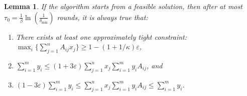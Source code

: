 \documentclass[11pt]{article}
\newtheorem{lemma}[theorem]{Lemma}
\newif\iffullpaper
\begin{document}
\begin{lemma}\label{lemma:approx-comp-slack}
If the algorithm starts from a feasible solution, then after at most $\tau_0 = \frac{1}{\beta}\ln\left(\frac{1}{\delta_{\min}}\right)$ rounds, it is always true that:
\begin{enumerate}[noitemsep,topsep=3pt]
\item There exists at least one approximately tight constraint: $\max_i\big\{\sum_{j=1}^n A_{ij}x_j\big\}\geq 1-(1+1/\kappa)\varepsilon$, 
\item $\sum_{i=1}^m y_i\leq (1+3\varepsilon)\sum_{j=1}^nx_j\sum_{i=1}^m y_i A_{ij}$, and
\item $(1-3\varepsilon)\sum_{i=1}^m y_i\leq \sum_{j=1}^n x_j\sum_{i=1}^m y_i A_{ij}\leq \sum_{i=1}^m y_i$.
\end{enumerate}
\end{lemma}
\iffullpaper
\end{document}

